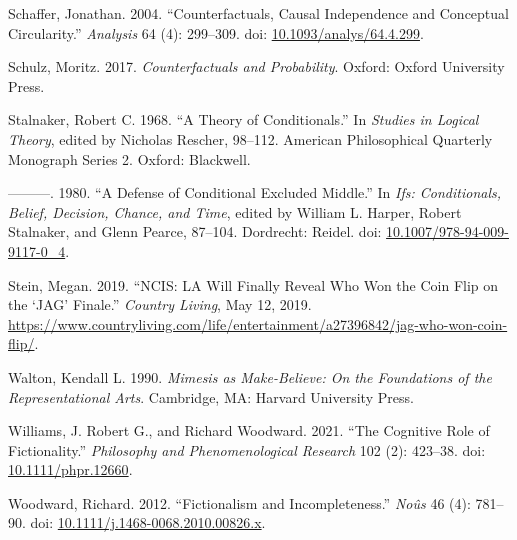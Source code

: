 \documentclass[
  11pt,
  letterpaper,
  DIV=11,
  numbers=noendperiod,
  twoside]{scrartcl}
\newlength{\cslhangindent}
\newenvironment{CSLReferences}[2] %
 {\begin{list}{}{%
  \setlength{\itemindent}{0pt}
  \setlength{\leftmargin}{0pt}
  \setlength{\parsep}{0pt}
  \ifodd #1
   \setlength{\leftmargin}{\cslhangindent}
   \setlength{\itemindent}{-1\cslhangindent}
  \fi
  \setlength{\itemsep}{#2\baselineskip}}}
 {\end{list}}
\begin{document}
\begin{CSLReferences}{1}{0}
Schaffer, Jonathan. 2004. {``Counterfactuals, Causal Independence and
Conceptual Circularity.''} \emph{Analysis} 64 (4): 299--309. doi:
\href{https://doi.org/10.1093/analys/64.4.299}{10.1093/analys/64.4.299}.

Schulz, Moritz. 2017. \emph{Counterfactuals and Probability}. Oxford:
Oxford University Press.

Stalnaker, Robert C. 1968. {``A Theory of Conditionals.''} In
\emph{Studies in Logical Theory}, edited by Nicholas Rescher, 98--112.
American Philosophical Quarterly Monograph Series 2. Oxford: Blackwell.

---------. 1980. {``A Defense of Conditional Excluded Middle.''} In
\emph{Ifs: Conditionals, Belief, Decision, Chance, and Time}, edited by
William L. Harper, Robert Stalnaker, and Glenn Pearce, 87--104.
Dordrecht: Reidel. doi:
\href{https://doi.org/10.1007/978-94-009-9117-0_4}{10.1007/978-94-009-9117-0\_4}.

Stein, Megan. 2019. {``{NCIS: LA} Will Finally Reveal Who Won the Coin
Flip on the {`{JAG}'} Finale.''} \emph{Country Living}, May 12, 2019.
\url{https://www.countryliving.com/life/entertainment/a27396842/jag-who-won-coin-flip/}.

Walton, Kendall L. 1990. \emph{Mimesis as Make-Believe: On the
Foundations of the Representational Arts}. Cambridge, MA: Harvard
University Press.

Williams, J. Robert G., and Richard Woodward. 2021. {``The Cognitive
Role of Fictionality.''} \emph{Philosophy and Phenomenological Research}
102 (2): 423--38. doi:
\href{https://doi.org/10.1111/phpr.12660}{10.1111/phpr.12660}.

Woodward, Richard. 2012. {``Fictionalism and Incompleteness.''}
\emph{No{û}s} 46 (4): 781--90. doi:
\href{https://doi.org/10.1111/j.1468-0068.2010.00826.x}{10.1111/j.1468-0068.2010.00826.x}.

\end{CSLReferences}
\end{document}
